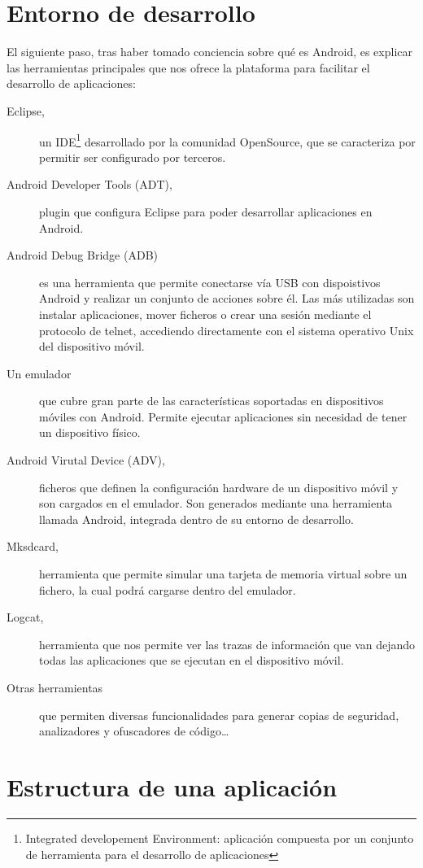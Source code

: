 \section{Entorno de desarrollo}

El siguiente paso, tras haber tomado conciencia sobre qué es Android, es explicar las herramientas principales que nos ofrece la plataforma para facilitar el desarrollo de aplicaciones:

\begin{description}
\item [Eclipse,] un IDE\footnote{Integrated developement Environment: aplicación compuesta por un conjunto de herramienta para el desarrollo de aplicaciones} desarrollado por la comunidad OpenSource, que se caracteriza por permitir ser configurado por terceros. 
\item [Android Developer Tools (ADT),] plugin que configura Eclipse para poder desarrollar aplicaciones en Android.
\item [Android Debug Bridge (ADB)] es una herramienta que permite conectarse vía USB con dispoistivos Android y realizar un conjunto de acciones sobre él. Las más utilizadas son instalar aplicaciones, mover ficheros o crear una sesión mediante el protocolo de telnet, accediendo directamente con el sistema operativo Unix del dispositivo móvil.
\item [Un emulador] que cubre gran parte de las características soportadas en dispositivos móviles con Android. Permite ejecutar aplicaciones sin necesidad de tener un dispositivo físico. 
\item [Android Virutal Device (ADV),] ficheros que definen la configuración hardware de un dispositivo móvil y son cargados en el emulador. Son generados mediante una herramienta llamada Android, integrada dentro de su entorno de desarrollo.
\item [Mksdcard,] herramienta que permite simular una tarjeta de memoria virtual sobre un fichero, la cual podrá cargarse dentro del emulador.
\item [Logcat,] herramienta que nos permite ver las trazas de información que van dejando todas las aplicaciones que se ejecutan en el dispositivo móvil.
\item [Otras herramientas] que permiten diversas funcionalidades para generar copias de seguridad, analizadores y ofuscadores de código\ldots\ 
\end{description}


\section{Estructura de una aplicación}


